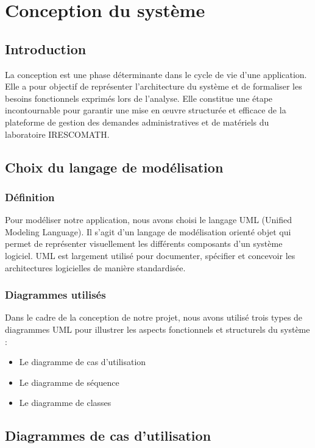 \chapter{Conception du système}

\section{Introduction}

La conception est une phase déterminante dans le cycle de vie d'une application. Elle a pour objectif de représenter l'architecture du système et de formaliser les besoins fonctionnels exprimés lors de l'analyse. Elle constitue une étape incontournable pour garantir une mise en œuvre structurée et efficace de la plateforme de gestion des demandes administratives et de matériels du laboratoire IRESCOMATH.

\section{Choix du langage de modélisation}

\subsection{Définition}

Pour modéliser notre application, nous avons choisi le langage UML (Unified Modeling Language). Il s'agit d'un langage de modélisation orienté objet qui permet de représenter visuellement les différents composants d'un système logiciel. UML est largement utilisé pour documenter, spécifier et concevoir les architectures logicielles de manière standardisée.

\subsection{Diagrammes utilisés}

Dans le cadre de la conception de notre projet, nous avons utilisé trois types de diagrammes UML pour illustrer les aspects fonctionnels et structurels du système :

\begin{itemize}
  \item Le diagramme de cas d'utilisation
  \item Le diagramme de séquence
  \item Le diagramme de classes
\end{itemize}

\section{Diagrammes de cas d'utilisation}

